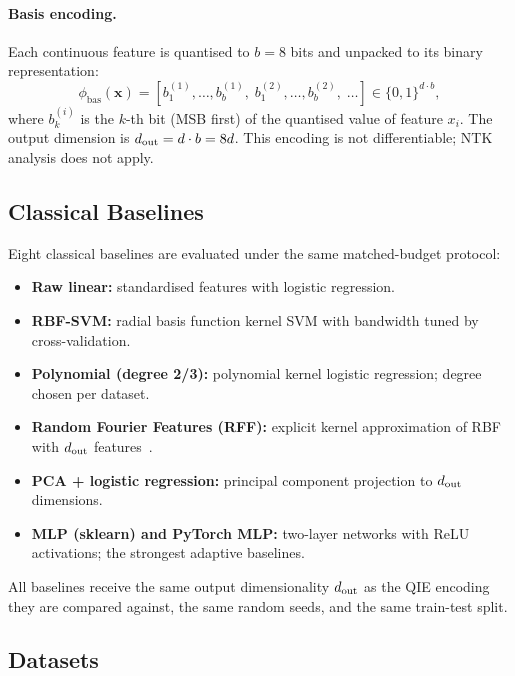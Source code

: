 \paragraph{Basis encoding.}
Each continuous feature is quantised to $b = 8$ bits and unpacked to its
binary representation:
\begin{equation}
  \phi_{\mathrm{bas}}(\mathbf{x}) =
    [b_1^{(1)},\ldots,b_b^{(1)},\;
     b_1^{(2)},\ldots,b_b^{(2)},\;\ldots]
    \in \{0,1\}^{d \cdot b},
  \label{eq:basis}
\end{equation}
where $b_k^{(i)}$ is the $k$-th bit (MSB first) of the quantised value of
feature $x_i$.
The output dimension is $d_{\mathrm{out}} = d \cdot b = 8d$.
This encoding is not differentiable; NTK analysis does not apply.

\subsection{Classical Baselines}
\label{sec:baselines}

Eight classical baselines are evaluated under the same matched-budget protocol:

\begin{itemize}
  \item \textbf{Raw linear:} standardised features with logistic regression.
  \item \textbf{RBF-SVM:} radial basis function kernel SVM with bandwidth
        tuned by cross-validation.
  \item \textbf{Polynomial (degree 2/3):} polynomial kernel logistic
        regression; degree chosen per dataset.
  \item \textbf{Random Fourier Features (RFF):} explicit kernel approximation
        of RBF with $d_{\mathrm{out}}$ features~\citep{rahimi2007}.
  \item \textbf{PCA + logistic regression:} principal component projection
        to $d_{\mathrm{out}}$ dimensions.
  \item \textbf{MLP (sklearn) and PyTorch MLP:} two-layer networks
        with ReLU activations; the strongest adaptive baselines.
\end{itemize}

All baselines receive the same output dimensionality $d_{\mathrm{out}}$ as the QIE
encoding they are compared against, the same random seeds, and the same
train-test split.

\subsection{Datasets}
\label{sec:datasets}

